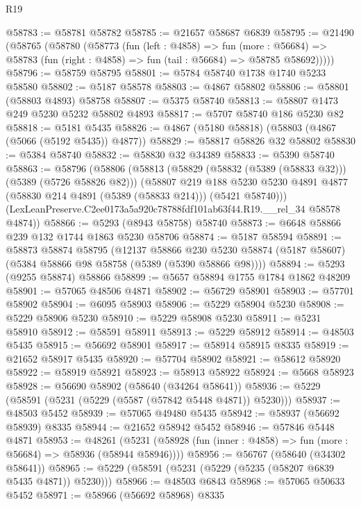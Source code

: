 \begin{lexlean}{R19}
\begin{coremodule}
@58783 := @58781 @58782
@58785 := @21657 @58687 @6839
@58795 := @21490
    (@58765
      (@58780
        (@58773
          (fun (left : @4858) =>
          fun (more : @56684) =>
          @58783 (fun (right : @4858) => fun (tail : @56684) => @58785 @58692)))))
@58796 := @58759 @58795
@58801 := @5784 @58740 @1738 @1740 @5233 @58580
@58802 := @5187 @58578
@58803 := @4867 @58802
@58806 := @58801 (@58803 @4893) @58758
@58807 := @5375 @58740
@58813 := @58807 @1473 @249 @5230 @5232 @58802 @4893
@58817 := @5707 @58740 @186 @5230 @82
@58818 := @5181 @5435
@58826 := @4867 (@5180 @58818) (@58803 (@4867 (@5066 (@5192 @5435)) @4877))
@58829 := @58817 @58826 @32 @58802
@58830 := @5384 @58740
@58832 := @58830 @32 @34389
@58833 := @5390 @58740
@58863 := @58796
    (@58806
      (@58813
        (@58829 (@58832 (@5389 (@58833 @32))) (@5389 (@5726 @58826 @82)))
        (@58807
          @219
          @188
          @5230
          @5230
          @4891
          @4877
          (@58830 @214 @4891 (@5389 (@58833 @214)))
          (@5421 @58740)))
      (LexLeanPreserve.C2ee0173a5a920c78788fdf101ab63f44.R19.__rel_34 @58578 @4874))
@58866 := @5293 (@8943 @58758) @58740
@58873 := @6648 @58866 @239 @132 @1744 @1863 @5230 @58706
@58874 := @5187 @58594
@58891 := @58873
    @58874
    @58795
    (@12137
      @58866
      @230
      @5230
      @58874
      (@5187 @58607)
      (@5384 @58866 @98 @58758 (@5389 (@5390 @58866 @98))))
@58894 := @5293 (@9255 @58874) @58866
@58899 := @5657 @58894 @1755 @1784 @1862 @48209
@58901 := @57065 @48506 @4871
@58902 := @56729 @58901
@58903 := @57701 @58902
@58904 := @6095 @58903
@58906 := @5229 @58904 @5230
@58908 := @5229 @58906 @5230
@58910 := @5229 @58908 @5230
@58911 := @5231 @58910
@58912 := @58591 @58911
@58913 := @5229 @58912
@58914 := @48503 @5435
@58915 := @56692 @58901
@58917 := @58914 @58915 @8335
@58919 := @21652 @58917 @5435
@58920 := @57704 @58902
@58921 := @58612 @58920
@58922 := @58919 @58921
@58923 := @58913 @58922
@58924 := @5668 @58923
@58928 := @56690 @58902 (@58640 (@34264 @58641))
@58936 := @5229 (@58591 (@5231 (@5229 (@5587 (@57842 @5448 @4871)) @5230)))
@58937 := @48503 @5452
@58939 := @57065 @49480 @5435
@58942 := @58937 (@56692 @58939) @8335
@58944 := @21652 @58942 @5452
@58946 := @57846 @5448 @4871
@58953 := @48261
    (@5231 (@58928 (fun (inner : @4858) => fun (more : @56684) => @58936 (@58944 @58946))))
@58956 := @56767 (@58640 (@34302 @58641))
@58965 := @5229 (@58591 (@5231 (@5229 (@5235 (@58207 @6839 @5435 @4871)) @5230)))
@58966 := @48503 @6843
@58968 := @57065 @50633 @5452
@58971 := @58966 (@56692 @58968) @8335

\end{coremodule}
\end{lexlean}
